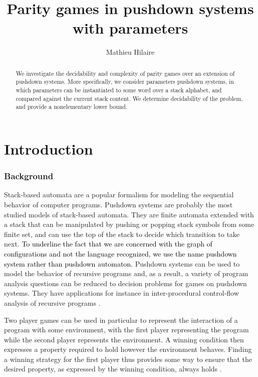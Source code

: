 \documentclass[a4paper,UKenglish,cleveref, autoref, thm-restate]{lipics-v2021}
\title{Parity games in pushdown systems with parameters}
\author{Mathieu Hilaire}{Université Paris-Saclay\and
CNRS\and
ENS Paris-Saclay\and
Laboratoire Méthodes Formelles (LMF)\and
Gif-sur-Yvette, France
}{hilaire@lsv.fr}{}{This work was partly done while the author was supported by the 
Agence Nationale de la Recherche grant no.  ANR-17-CE40-0010.}
\begin{document}
\maketitle


\begin{abstract}
	We investigate the decidability and complexity of
	parity games over an extension of pushdown systems.
	More specifically, we consider parameters pushdown systems, in
	which parameters can be instantiated to some word over a stack alphabet,
	and compared against the current stack content.
	We determine decidability of the problem, and provide a nonelementary lower bound. 
\end{abstract}

\section{Introduction}

\subsubsection*{Background}



Stack-based automata are a popular formalism for modeling the sequential behavior of computer programs. 
Pushdown systems are probably the most studied models of stack-based automata.
They are
finite automata 
 extended with a stack that can be manipulated by pushing or popping stack symbols from some finite set, and can use the top of the stack to decide which transition to take next.
\textcolor{black}{To underline the fact that we are concerned with the graph of configurations and not the language recognized, we use the name pushdown system rather than pushdown automaton.}
Pushdown systems can be used to model the behavior of recursive programs and,
as a result, a variety of 
 program analysis questions can be reduced to decision problems for games on pushdown systems.
They have applications for instance in inter-procedural control-flow analysis of recursive programs \cite{esparza1999automata, reps2005weighted}.





Two player games can be used in particular to
 represent the
interaction of a program with some environment, with the first player representing the program while the second player represents the environment. A winning condition then expresses a property required to hold however the environment behaves. Finding a winning strategy for the first player
thus provides some way 
 to ensure that the desired 
property, as expressed by the winning condition,
always holds \cite{arnold2003games}.
\end{document}
